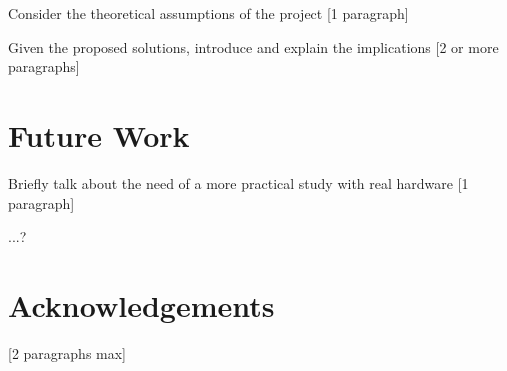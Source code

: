 \documentclass{article}
\begin{document}
Consider the theoretical assumptions of the project [1 paragraph]

Given the proposed solutions, introduce and explain the implications [2 or more paragraphs]










\section{Future Work}
\label{sec:futurework}

Briefly talk about the need of a more practical study with real hardware [1 paragraph]

...?











\section{Acknowledgements}
\label{sec:acknowledgements}

[2 paragraphs max]

\printbibliography


\end{document}
